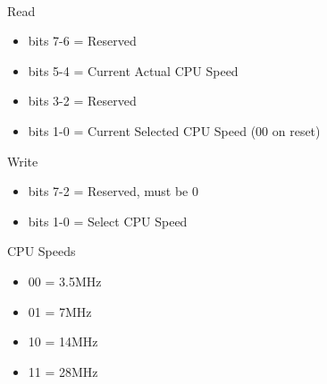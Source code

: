 \\
Read
\begin{itemize}
\item bits 7-6 = Reserved
\item bits 5-4 = Current Actual CPU Speed
\item bits 3-2 = Reserved
\item bits 1-0 = Current Selected CPU Speed (00 on reset)
\end{itemize}
Write
\begin{itemize}
\item bits 7-2 = Reserved, must be 0
\item bits 1-0 = Select CPU Speed
\end{itemize}
CPU Speeds
\begin{itemize}
\item 00 = 3.5MHz
\item 01 = 7MHz
\item 10 = 14MHz
\item 11 = 28MHz
\end{itemize}

